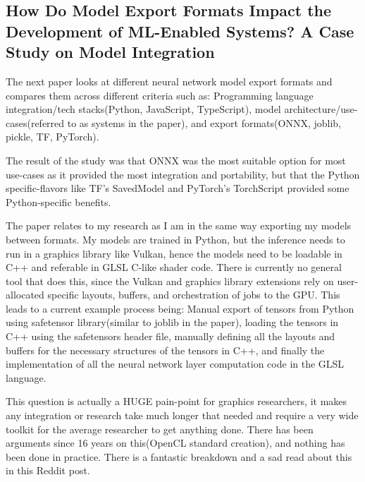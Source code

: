 \documentclass[a4paper, 11pt]{article} %
\begin{document}
\subsection{How Do Model Export Formats Impact the Development of ML-Enabled Systems? A Case Study on Model Integration}
The next paper\cite{systems_paper} looks at different neural network model export formats and compares them across different criteria such as:
Programming language integration/tech stacks(Python, JavaScript, TypeScript), model architecture/use-cases(referred to as systems in the paper), and export formats(ONNX, joblib, pickle, TF, PyTorch). 

The result of the study was that ONNX was the most suitable option for most use-cases as it provided the most integration and portability, but that the Python specific-flavors 
like TF's SavedModel and PyTorch's TorchScript provided some Python-specific benefits.

The paper relates to my research as I am in the same way exporting my models between formats. My models are trained in Python, but the inference needs to run in a graphics library like Vulkan, hence the
models need to be loadable in C++ and referable in GLSL C-like shader code.
There is currently no general tool that does this, since the Vulkan and graphics library extensions rely on user-allocated specific layouts, buffers, and orchestration of jobs to the GPU.
This leads to a current example process being: Manual export of tensors from Python using safetensor library(similar to joblib in the paper), loading the tensors in C++ using the safetensors header file,
manually defining all the layouts and buffers for the necessary structures of the tensors in C++, and finally the implementation of all the neural network layer computation code in the GLSL language. 

This question is actually a HUGE pain-point for graphics researchers, it makes any integration or research take much longer that needed and require a very wide toolkit for the average researcher to get anything done.
There has been arguments since 16 years on this(OpenCL standard creation), and nothing has been done in practice. There is a fantastic breakdown and a sad read about this in this Reddit post\cite{reddit_gpgpu}.
\end{document}
